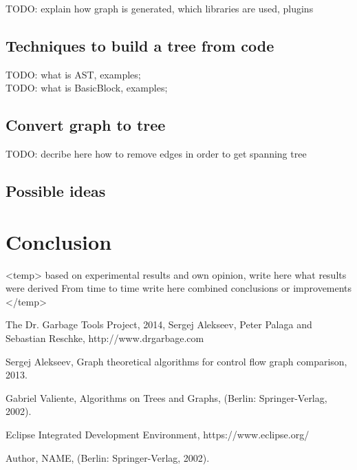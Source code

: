 \documentclass{report}
\begin{document}
TODO: explain how graph is generated, which libraries are used, plugins

\section{Techniques to build a tree from code}
TODO: what is AST, examples;
\\
TODO: what is BasicBlock, examples;

\section{Convert graph to tree}

TODO: decribe here how to remove edges in order to get spanning tree

\section{Possible ideas}



\chapter{Conclusion}
\label{cha:Conclusion}

<temp>
based on experimental results and own opinion, write here what results were derived 
From time to time write here combined conclusions or improvements
</temp>



\newpage
%
\begin{thebibliography}{100} %

 The Dr. Garbage Tools Project\textregistered \enspace, 2014, Sergej Alekseev, Peter Palaga and Sebastian Reschke,
http://www.drgarbage.com

  Sergej Alekseev, Graph theoretical algorithms for control flow graph comparison, 2013.
 
 Gabriel Valiente, Algorithms on Trees and Graphs,
(Berlin: Springer-Verlag, 2002).


 Eclipse Integrated Development Environment, https://www.eclipse.org/

 Author, NAME,
(Berlin: Springer-Verlag, 2002).

\end{thebibliography} 
\end{document}
